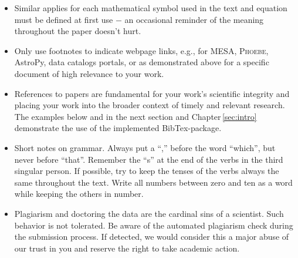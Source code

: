\begin{itemize}
    \item Similar applies for each mathematical symbol used in the text and equation must be defined at first use $-$ an occasional reminder of the meaning throughout the paper doesn't hurt. 
    
    \item Only use footnotes to indicate webpage links, e.g., for MESA, \textsc{Phoebe}, AstroPy, data catalogs portals, or as demonstrated above for a specific document of high relevance to your work.
    
    \item References to papers are fundamental for your work's scientific integrity and placing your work into the broader context of timely and relevant research. The examples below and in the next section and Chapter\,\ref{sec:intro} demonstrate the use of the implemented BibTex-package.
    
    \item Short notes on grammar. Always put a ``,'' before the word ``which'', but never before ``that''. Remember the ``s'' at the end of the verbs in the third singular person. If possible, try to keep the tenses of the verbs always the same throughout the text.  Write all numbers between zero and ten as a word while keeping the others in number.
    
    \item Plagiarism and doctoring the data are the cardinal sins of a scientist. Such behavior is not tolerated. Be aware of the automated plagiarism check during the submission process. If detected, we would consider this a major abuse of our trust in you and reserve the right to take academic action.
    
\end{itemize}

